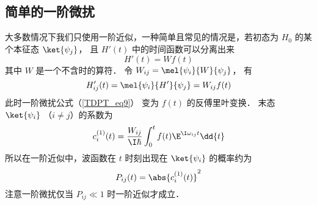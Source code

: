 \subsection{简单的一阶微扰}
大多数情况下我们只使用一阶近似，一种简单且常见的情况是，若初态为 $H_0$ 的某个本征态 $\ket{\psi_j}$， 且 $H'(t)$ 中的时间函数可以分离出来
\begin{equation}
H'(t) = W f(t)
\end{equation}
其中 $W$ 是一个不含时的算符． 令 $W_{ij} = \mel{\psi_i}{W}{\psi_j}$， 有
\begin{equation}
H'_{ij}(t) = \mel{\psi_i}{H'}{\psi_j} = W_{ij}f(t)
\end{equation}
此时一阶微扰公式（\autoref{TDPT_eq9}） 变为 $f(t)$ 的反傅里叶变换． 末态 $\ket{\psi_i}$ （$i \neq j$）的系数为
\begin{equation}
c_i^{(1)}(t) = \frac{W_{ij}}{\I\hbar} \int_0^t f(t)\E^{\I\omega_{ij} t} \dd{t}
\end{equation}
所以在一阶近似中，波函数在 $t$ 时刻出现在 $\ket{\psi_i}$ 的概率约为
\begin{equation}
P_{ij}(t) = \abs{c_i^{(1)}(t)}^2
\end{equation}
注意一阶微扰仅当 $P_{ij} \ll 1$ 时一阶近似才成立．

